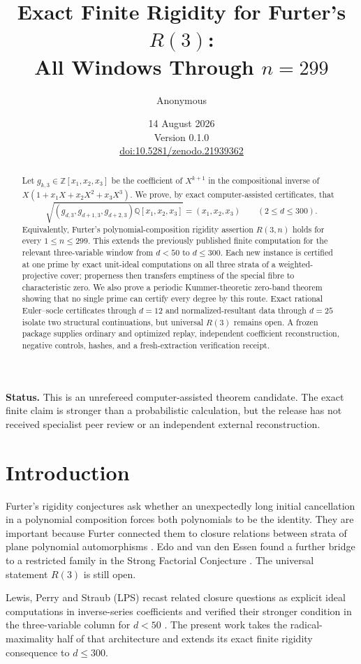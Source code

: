 \documentclass[11pt]{article}
\title{Exact Finite Rigidity for Furter's \texorpdfstring{$R(3)$}{R(3)}:\\All Windows Through \texorpdfstring{$n=299$}{n=299}}
\author{Anonymous}
\date{14 August 2026\\Version 0.1.0\\\href{https://doi.org/10.5281/zenodo.21939362}{doi:10.5281/zenodo.21939362}}
\theoremstyle{definition}
\newcommand{\QQ}{\mathbb{Q}}
\newcommand{\ZZ}{\mathbb{Z}}
\begin{document}
\maketitle

\begin{abstract}
Let $g_{k,3}\in\ZZ[x_1,x_2,x_3]$ be the coefficient of $X^{k+1}$ in the
compositional inverse of
$X(1+x_1X+x_2X^2+x_3X^3)$.  We prove, by exact computer-assisted
certificates, that
\[
 \sqrt{(g_{d,3},g_{d+1,3},g_{d+2,3})\QQ[x_1,x_2,x_3]}
   =(x_1,x_2,x_3)
 \qquad(2\le d\le300).
\]
Equivalently, Furter's polynomial-composition rigidity assertion $R(3,n)$
holds for every $1\le n\le299$.  This extends the previously published
finite computation for the relevant three-variable window from $d<50$ to
$d\le300$.  Each new instance is certified at one prime by exact unit-ideal
computations on all three strata of a weighted-projective cover; properness
then transfers emptiness of the special fibre to characteristic zero.  We
also prove a periodic Kummer-theoretic zero-band theorem showing that no
single prime can certify every degree by this route.  Exact rational
Euler--socle certificates through $d=12$ and normalized-resultant data through
$d=25$ isolate two structural continuations, but universal $R(3)$ remains
open.  A frozen package supplies ordinary and optimized replay, independent
coefficient reconstruction, negative controls, hashes, and a fresh-extraction
verification receipt.
\end{abstract}

\noindent\textbf{Status.} This is an unrefereed computer-assisted theorem
candidate.  The exact finite claim is stronger than a probabilistic
calculation, but the release has not received specialist peer review or an
independent external reconstruction.

\section{Introduction}

Furter's rigidity conjectures ask whether an unexpectedly long initial
cancellation in a polynomial composition forces both polynomials to be the
identity.  They are important because Furter connected them to closure
relations between strata of plane polynomial automorphisms
\cite{Furter2015}.  Edo and van den Essen found a further bridge to a
restricted family in the Strong Factorial Conjecture \cite{EdoVdE2014}.
The universal statement $R(3)$ is still open.

Lewis, Perry and Straub (LPS) recast related closure questions as explicit
ideal computations in inverse-series coefficients and verified their stronger
condition in the three-variable column for $d<50$ \cite{LPS2019}.  The present
work takes the radical-maximality half of that architecture and extends its
exact finite rigidity consequence to $d\le300$.
\end{document}
